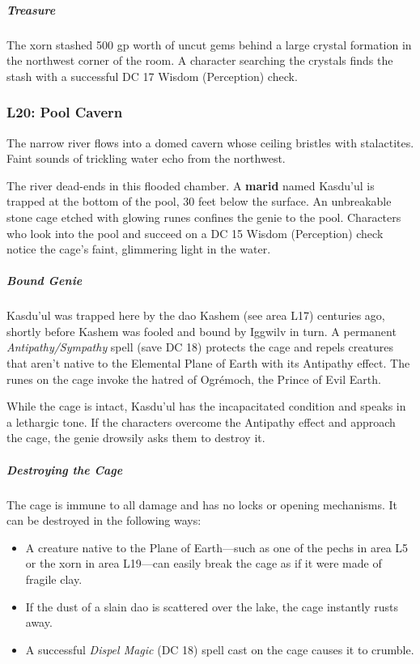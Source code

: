 \documentclass[10pt,a4paper,twoside,bg=print,twocolumn,openany,nodeprecatedcode]{dndbook}
\begin{document}
\subparagraph{Treasure}
The xorn stashed 500 gp worth of uncut gems behind a large crystal formation in the northwest corner of the room. A character searching the crystals finds the stash with a successful DC 17 Wisdom (Perception) check.

\subsubsection{L20: Pool Cavern}
\begin{DndReadAloud}{}
The narrow river flows into a domed cavern whose ceiling bristles with stalactites. Faint sounds of trickling water echo from the northwest.

\end{DndReadAloud}

The river dead-ends in this flooded chamber. A \textbf{marid} named Kasdu'ul is trapped at the bottom of the pool, 30 feet below the surface. An unbreakable stone cage etched with glowing runes confines the genie to the pool. Characters who look into the pool and succeed on a DC 15 Wisdom (Perception) check notice the cage's faint, glimmering light in the water.

\subparagraph{Bound Genie}
Kasdu'ul was trapped here by the dao Kashem (see area L17) centuries ago, shortly before Kashem was fooled and bound by Iggwilv in turn. A permanent \textit{Antipathy/Sympathy} spell (save DC 18) protects the cage and repels creatures that aren't native to the Elemental Plane of Earth with its Antipathy effect. The runes on the cage invoke the hatred of Ogrémoch, the Prince of Evil Earth.

While the cage is intact, Kasdu'ul has the incapacitated condition and speaks in a lethargic tone. If the characters overcome the Antipathy effect and approach the cage, the genie drowsily asks them to destroy it.

\subparagraph{Destroying the Cage}
The cage is immune to all damage and has no locks or opening mechanisms. It can be destroyed in the following ways:


\begin{itemize}
\item A creature native to the Plane of Earth—such as one of the pechs in area L5 or the xorn in area L19—can easily break the cage as if it were made of fragile clay.
\item If the dust of a slain dao is scattered over the lake, the cage instantly rusts away.
\item A successful \textit{Dispel Magic} (DC 18) spell cast on the cage causes it to crumble.
\end{itemize}
\end{document}
